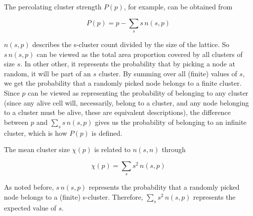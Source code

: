 The percolating cluster strength $P(p)$, for example, can be obtained from 

\begin{equation}
P(p) = p - \sum_s s\, n(s, p)
\end{equation}

$n(s, p)$ describes the s-cluster count divided by the size of the lattice. So $s\, n(s, p)$ can be viewed as the total area proportion covered by all clusters of size $s$. In other other, it represents the probability that by picking a node at random, it will be part of an $s$ cluster. By summing over all (finite) values of $s$, we get the probability that a randomly picked node belongs to a finite cluster. Since $p$ can be viewed as representing the probability of belonging to any cluster (since any
alive cell will, necessarily, belong to a cluster, and any node belonging to a cluster must be alive, these are equivalent descriptions), the difference between $p$ and $\sum_s s\, n(s, p)$ gives us the probability of belonging to an infinite cluster, which is how $P(p)$ is defined.


The mean cluster size $\chi(p)$ is related to $n(s, n)$ through 

\begin{equation}
    \chi(p) = \sum_s s^2\, n(s, p)
\end{equation}

As noted before, $s\, n(s, p)$ represents the probability that a randomly picked node belongs to a (finite) s-cluster. Therefore, $\sum_s s^2\, n(s, p)$ represents the expected value of $s$.












